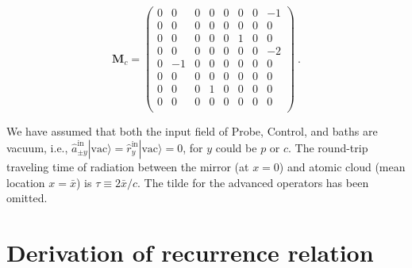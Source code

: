 \documentclass[aps, pra, reprint, amsmath, amssymb, groupedaddress, acknowledgments]{revtex4-1}
\begin{document}
\begin{equation}
\mathbf{M}_{c}= 
\left(
\begin{array}{cccccccc}
 0 & 0 & 0 & 0 & 0 & 0 & 0 & -1 \\
 0 & 0 & 0 & 0 & 0 & 0 & 0 & 0 \\
 0 & 0 & 0 & 0 & 0 & 1 & 0 & 0 \\
 0 & 0 & 0 & 0 & 0 & 0 & 0 & -2 \\
 0 & -1 & 0 & 0 & 0 & 0 & 0 & 0 \\
 0 & 0 & 0 & 0 & 0 & 0 & 0 & 0 \\
 0 & 0 & 0 & 1 & 0 & 0 & 0 & 0 \\
 0 & 0 & 0 & 0 & 0 & 0 & 0 & 0 \\
\end{array}
\right)~.
\end{equation}

We have assumed that both the input field of Probe, Control, and baths are vacuum, i.e., $\hat{a}_{\pm y}^\textrm{in}|\textrm{vac}\rangle = \hat{r}_y^\textrm{in}|\textrm{vac}\rangle =0$, for $y$ could be $p$ or $c$.  The round-trip traveling time of radiation between the mirror (at $x=0$) and atomic cloud (mean location $x=\bar{x}$) is $\tau \equiv 2 \bar{x}/c$.  The tilde for the advanced operators has been omitted.

\section{Derivation of recurrence relation \label{app:recurrence}}
\end{document}
